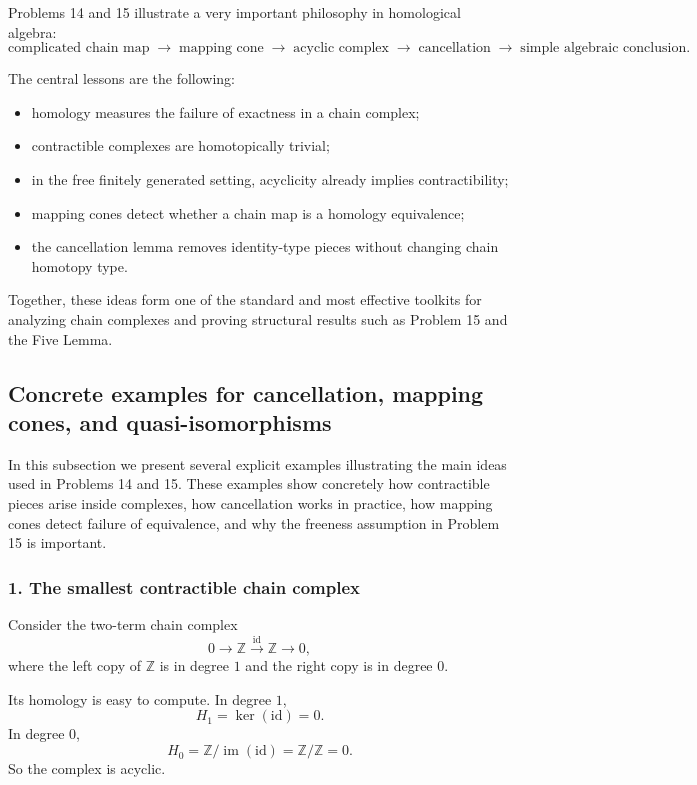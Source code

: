 \documentclass[12pt,a4paper]{article}
\theoremstyle{notespace}
\begin{document}
Problems 14 and 15 illustrate a very important philosophy in homological algebra:
\[
\text{complicated chain map}
\;\longrightarrow\;
\text{mapping cone}
\;\longrightarrow\;
\text{acyclic complex}
\;\longrightarrow\;
\text{cancellation}
\;\longrightarrow\;
\text{simple algebraic conclusion}.
\]

The central lessons are the following:
\begin{itemize}
	\item homology measures the failure of exactness in a chain complex;
	\item contractible complexes are homotopically trivial;
	\item in the free finitely generated setting, acyclicity already implies contractibility;
	\item mapping cones detect whether a chain map is a homology equivalence;
	\item the cancellation lemma removes identity-type pieces without changing chain homotopy type.
\end{itemize}

Together, these ideas form one of the standard and most effective toolkits for analyzing chain complexes and proving structural results such as Problem 15 and the Five Lemma.

\subsection{Concrete examples for cancellation, mapping cones, and quasi-isomorphisms}

In this subsection we present several explicit examples illustrating the main ideas used in Problems 14 and 15. These examples show concretely how contractible pieces arise inside complexes, how cancellation works in practice, how mapping cones detect failure of equivalence, and why the freeness assumption in Problem 15 is important.

\subsubsection*{1. The smallest contractible chain complex}

Consider the two-term chain complex
\[
0 \longrightarrow \mathbb Z \xrightarrow{\;\mathrm{id}\;} \mathbb Z \longrightarrow 0,
\]
where the left copy of \(\mathbb Z\) is in degree \(1\) and the right copy is in degree \(0\).

Its homology is easy to compute. In degree \(1\),
\[
H_1=\ker(\mathrm{id})=0.
\]
In degree \(0\),
\[
H_0=\mathbb Z/\operatorname{im}(\mathrm{id})=\mathbb Z/\mathbb Z=0.
\]
So the complex is acyclic.
\end{document}
